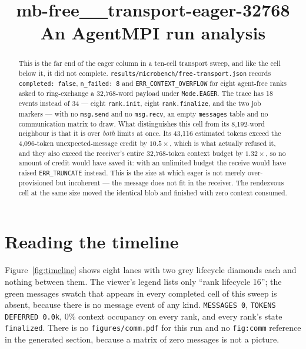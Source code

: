 \documentclass[11pt]{article}
\title{\textbf{mb-free\_\_transport-eager-32768}\\[2pt]\large An AgentMPI run analysis}
\author{}
\date{}
\begin{document}
\maketitle

\begin{abstract}
This is the far end of the eager column in a ten-cell transport sweep, and like the
cell below it, it did not complete.
\texttt{results/microbench/free-transport.json} records \texttt{completed: false},
\texttt{n\_failed: 8} and \texttt{ERR\_CONTEXT\_OVERFLOW} for eight agent-free ranks
asked to ring-exchange a 32{,}768-word payload under \texttt{Mode.EAGER}. The trace
has 18 events instead of 34 --- eight \texttt{rank.init}, eight
\texttt{rank.finalize}, and the two job markers --- with no \texttt{msg.send} and no
\texttt{msg.recv}, an empty \texttt{messages} table and no communication matrix to
draw. What distinguishes this cell from its 8{,}192-word neighbour is that it is over
\emph{both} limits at once. Its 43{,}116 estimated tokens exceed the 4{,}096-token
unexpected-message credit by $10.5\times$, which is what actually refused it, and
they also exceed the receiver's entire 32{,}768-token context budget by $1.32\times$,
so no amount of credit would have saved it: with an unlimited budget the receive
would have raised \texttt{ERR\_TRUNCATE} instead. This is the size at which eager is
not merely over-provisioned but incoherent --- the message does not fit in the
receiver. The rendezvous cell at the same size moved the identical blob and finished
with zero context consumed.
\end{abstract}



\section{Reading the timeline}

Figure~\ref{fig:timeline} shows eight lanes with two grey lifecycle diamonds each and
nothing between them. The viewer's legend lists only ``rank lifecycle 16''; the green
messages swatch that appears in every completed cell of this sweep is absent, because
there is no message event of any kind. \texttt{MESSAGES 0}, \texttt{TOKENS DEFERRED
0.0k}, 0\% context occupancy on every rank, and every rank's state
\texttt{finalized}. There is no \texttt{figures/comm.pdf} for this run and no
\texttt{fig:comm} reference in the generated section, because a matrix of zero
messages is not a picture.
\end{document}
